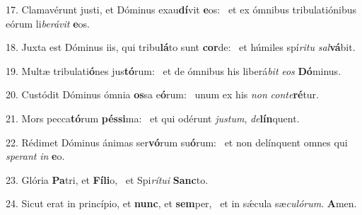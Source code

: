 17. Clamavérunt justi, et Dóminus exau\textbf{dí}vit \textbf{e}os: \ast\  et ex ómnibus tribulatiónibus eórum li\textit{be}\textit{rá}\textit{vit} \textbf{e}os.\

18. Juxta est Dóminus iis, qui tribu\textbf{lá}to sunt \textbf{cor}de: \ast\  et húmiles spí\textit{ri}\textit{tu} \textit{sal}\textbf{vá}bit.\

19. Multæ tribulati\textbf{ó}nes jus\textbf{tó}rum: \ast\  et de ómnibus his liberá\textit{bit} \textit{e}\textit{os} \textbf{Dó}minus.\

20. Custódit Dóminus ómnia \textbf{os}sa e\textbf{ó}rum: \ast\  unum ex his \textit{non} \textit{con}\textit{te}\textbf{ré}tur.\

21. Mors pecca\textbf{tó}rum \textbf{pés}\textbf{si}ma: \ast\  et qui odérunt \textit{jus}\textit{tum}, \textit{de}\textbf{lín}quent.\

22. Rédimet Dóminus ánimas ser\textbf{vó}rum su\textbf{ó}rum: \ast\  et non delínquent omnes qui \textit{spe}\textit{rant} \textit{in} \textbf{e}o.\

23. Glória \textbf{Pa}tri, et \textbf{Fí}\textbf{li}o, \ast\  et Spi\textit{rí}\textit{tu}\textit{i} \textbf{Sanc}to.\

24. Sicut erat in princípio, et \textbf{nunc}, et \textbf{sem}per, \ast\  et in sǽcula sæ\textit{cu}\textit{ló}\textit{rum}. \textbf{A}men.\

